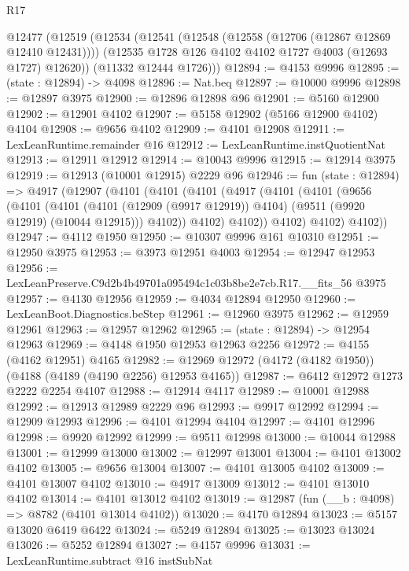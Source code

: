 \begin{lexlean}{R17}
\begin{coremodule}
  @12477
    (@12519
      (@12534
        (@12541
          (@12548 (@12558 (@12706 (@12867 @12869 @12410 @12431))))
          (@12535 @1728 @126 @4102 @4102 @1727 @4003 (@12693 @1727) @12620))
        (@11332 @12444 @1726)))
@12894 := @4153 @9996
@12895 := (state : @12894) -> @4098
@12896 := Nat.beq
@12897 := @10000 @9996
@12898 := @12897 @3975
@12900 := @12896 @12898 @96
@12901 := @5160 @12900
@12902 := @12901 @4102
@12907 := @5158 @12902 (@5166 @12900 @4102) @4104
@12908 := @9656 @4102
@12909 := @4101 @12908
@12911 := LexLeanRuntime.remainder @16
@12912 := LexLeanRuntime.instQuotientNat
@12913 := @12911 @12912
@12914 := @10043 @9996
@12915 := @12914 @3975
@12919 := @12913 (@10001 @12915) @2229 @96
@12946 := fun (state : @12894) =>
  @4917
    (@12907
      (@4101
        (@4101
          (@4101
            (@4917
              (@4101
                (@4101
                  (@9656
                    (@4101
                      (@4101
                        (@4101 (@12909 (@9917 @12919)) @4104)
                        (@9511 (@9920 @12919) (@10044 @12915)))
                      @4102))
                  @4102)
                @4102))
            @4102)
          @4102)
        @4102))
@12947 := @4112 @1950
@12950 := @10307 @9996 @161 @10310
@12951 := @12950 @3975
@12953 := @3973 @12951 @4003
@12954 := @12947 @12953
@12956 := LexLeanPreserve.C9d2b4b49701a095494c1c03b8be2e7cb.R17.__fits_56 @3975
@12957 := @4130 @12956
@12959 := @4034 @12894 @12950
@12960 := LexLeanBoot.Diagnostics.beStep
@12961 := @12960 @3975
@12962 := @12959 @12961
@12963 := @12957 @12962
@12965 := (state : @12894) -> @12954 @12963
@12969 := @4148 @1950 @12953 @12963 @2256
@12972 := @4155 (@4162 @12951) @4165
@12982 := @12969 @12972 (@4172 (@4182 @1950)) (@4188 (@4189 (@4190 @2256) @12953 @4165))
@12987 := @6412 @12972 @1273 @2222 @2254 @4107
@12988 := @12914 @4117
@12989 := @10001 @12988
@12992 := @12913 @12989 @2229 @96
@12993 := @9917 @12992
@12994 := @12909 @12993
@12996 := @4101 @12994 @4104
@12997 := @4101 @12996
@12998 := @9920 @12992
@12999 := @9511 @12998
@13000 := @10044 @12988
@13001 := @12999 @13000
@13002 := @12997 @13001
@13004 := @4101 @13002 @4102
@13005 := @9656 @13004
@13007 := @4101 @13005 @4102
@13009 := @4101 @13007 @4102
@13010 := @4917 @13009
@13012 := @4101 @13010 @4102
@13014 := @4101 @13012 @4102
@13019 := @12987 (fun (__b : @4098) => @8782 (@4101 @13014 @4102))
@13020 := @4170 @12894
@13023 := @5157 @13020 @6419 @6422
@13024 := @5249 @12894
@13025 := @13023 @13024
@13026 := @5252 @12894
@13027 := @4157 @9996
@13031 := LexLeanRuntime.subtract @16 instSubNat

\end{coremodule}
\end{lexlean}
